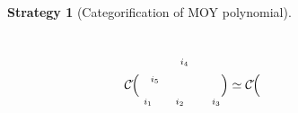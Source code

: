 \documentclass[10pt]{amsart}
\theoremstyle{break}
\newtheorem{str}[de]{Strategy}
\begin{document}
\begin{str}[Categorification of MOY polynomial]
\begin{itemize}
\begin{eqnarray*}
{{\mathcal{C}}}\acute{}\Big( 
\unitlength 0.1in
\begin{picture}(9.00,6.0)(2.00,-6.00)
\special{pn 8}\special{pa 200 800}\special{pa 223 766}\special{pa 245 733}\special{pa 268 702}\special{pa 291 674}\special{pa 313 648}\special{pa 336 628}\special{pa 358 612}\special{pa 381 603}\special{pa 404 600}\special{pa 426 605}\special{pa 449 616}\special{pa 472 634}\special{pa 494 656}\special{pa 517 682}\special{pa 539 712}\special{pa 562 744}\special{pa 585 777}\special{pa 600 800}\special{sp}\special{pn 8}\special{pa 400 600}\special{pa 423 570}\special{pa 445 540}\special{pa 468 512}\special{pa 491 485}\special{pa 513 461}\special{pa 536 440}\special{pa 558 422}\special{pa 581 408}\special{pa 604 399}\special{pa 626 395}\special{pa 649 395}\special{pa 672 400}\special{pa 694 409}\special{pa 717 423}\special{pa 739 439}\special{pa 762 460}\special{pa 785 483}\special{pa 807 509}\special{pa 830 537}\special{pa 853 568}\special{pa 875 600}\special{pa 898 634}\special{pa 920 669}\special{pa 943 706}\special{pa 966 743}\special{pa 988 781}\special{pa 1000 800}\special{sp}\special{pn 8}\special{pa 637 195}\special{pa 637 395}\special{fp}\special{sh 1}\special{pa 637 195}\special{pa 617 263}\special{pa 637 249}\special{pa 657 263}\special{pa 637 195}\special{fp}\special{sh 1}\special{pa 637 395}\special{pa 567 397}\special{pa 586 412}\special{pa 580 435}\special{pa 637 395}\special{fp}\special{sh 1}\special{pa 637 395}\special{pa 694 435}\special{pa 688 412}\special{pa 707 397}\special{pa 637 395}\special{fp}\special{sh 1}\special{pa 400 600}\special{pa 330 602}\special{pa 349 617}\special{pa 343 640}\special{pa 400 600}\special{fp}\special{sh 1}\special{pa 400 600}\special{pa 457 640}\special{pa 451 617}\special{pa 470 602}\special{pa 400 600}\special{fp}\put(7.0000,-3.250000){\makebox(0,0){${}^{i_4}$}}\put(3.750000,-5.0000){\makebox(0,0){${}_{i_5}$}}\put(10.50000,-7.50000){\makebox(0,0){${}_{i_3}$}}\put(3.0000,-7.50000){\makebox(0,0){${}_{i_1}$}}\put(6.50000,-7.50000){\makebox(0,0){${}_{i_2}$}}\end{picture}
\Big) \simeq {{\mathcal{C}}}\acute{}\Big( 
\unitlength 0.1in
\begin{picture}(9.00,6.0)(2.00,-6.00)

\end{picture}
\end{eqnarray*}
\end{itemize}
\end{str}
\end{document}
